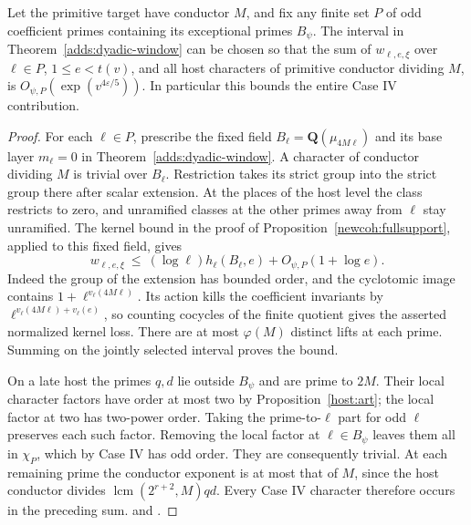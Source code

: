 \begin{corollary}\label{adds:fixed-char}
Let the primitive target have conductor \(M\), and fix any finite set
\(P\) of odd coefficient primes containing its exceptional primes
\(B_\psi\). The interval in Theorem~\ref{adds:dyadic-window} can
be chosen so that the sum of \(w_{\ell,e,\xi}\) over
\(\ell\in P\), \(1\le e<t(v)\), and all host characters of primitive
conductor dividing \(M\), is \(O_{\psi,P}(\exp(v^{4\varepsilon/5}))\).
In particular this bounds the entire Case IV contribution.
\end{corollary}
\begin{proof}
For each \(\ell\in P\), prescribe the fixed field
\(B_\ell=\mathbf Q(\mu_{4M\ell})\) and its base layer \(m_\ell=0\)
in Theorem~\ref{adds:dyadic-window}. A character of conductor dividing
\(M\) is trivial over \(B_\ell\). Restriction takes its strict group
into the strict group there after scalar extension. At the places of
the host level the class restricts to zero, and unramified classes
at the other primes away from \(\ell\) stay unramified. The kernel
bound in the proof of Proposition~\ref{newcoh:fullsupport}, applied
to this fixed field, gives
\[
 w_{\ell,e,\xi}\ \le\ (\log\ell)h_\ell(B_\ell,e)
                   +O_{\psi,P}(1+\log e).
\]
Indeed the group of the extension has bounded order, and the
cyclotomic image contains \(1+\ell^{v_\ell(4M\ell)}\). Its action
kills the coefficient invariants by
\(\ell^{v_\ell(4M\ell)+v_\ell(e)}\), so counting cocycles of the
finite quotient gives the asserted normalized kernel loss.
There are at most \(\varphi(M)\) distinct lifts at each prime.
Summing on the jointly selected interval proves the bound.

On a late host the primes \(q,d\) lie outside \(B_\psi\) and are
prime to \(2M\). Their local character factors have order at most
two by Proposition~\ref{host:art}; the local factor at two has
two-power order. Taking the prime-to-\(\ell\) part for odd \(\ell\)
preserves each such factor. Removing the local factor at
\(\ell\in B_\psi\) leaves them all in \(\chi_P\), which by Case IV
has odd order. They are consequently trivial. At each remaining
prime the conductor exponent is at most that of \(M\), since
the host conductor divides \(\operatorname{lcm}(2^{r+2},M)qd\).
Every Case IV character therefore occurs in the preceding sum.
and .
\end{proof}
